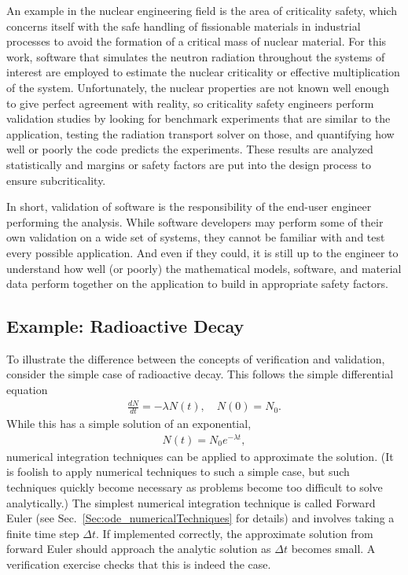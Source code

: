 An example in the nuclear engineering field is the area of criticality safety, which concerns itself with the safe handling of fissionable materials in industrial processes to avoid the formation of a critical mass of nuclear material. For this work, software that simulates the neutron radiation throughout the systems of interest are employed to estimate the nuclear criticality or effective multiplication of the system. Unfortunately, the nuclear properties are not known well enough to give perfect agreement with reality, so criticality safety engineers perform validation studies by looking for benchmark experiments that are similar to the application, testing the radiation transport solver on those, and quantifying how well or poorly the code predicts the experiments. These results are analyzed statistically and margins or safety factors are put into the design process to ensure subcriticality.

In short, validation of software is the responsibility of the end-user engineer performing the analysis. While software developers may perform some of their own validation on a wide set of systems, they cannot be familiar with and test every possible application. And even if they could, it is still up to the engineer to understand how well (or poorly) the mathematical models, software, and material data perform together on the application to build in appropriate safety factors.

\subsection{Example: Radioactive Decay}

To illustrate the difference between the concepts of verification and validation, consider the simple case of radioactive decay. This follows the simple differential equation
\begin{align}
  \frac{dN}{dt} = -\lambda N(t), \quad N(0) = N_0 .
\end{align}
While this has a simple solution of an exponential,
\begin{align}
  N(t) = N_0 e^{-\lambda t} ,
\end{align}
numerical integration techniques can be applied to approximate the solution. (It is foolish to apply numerical techniques to such a simple case, but such techniques quickly become necessary as problems become too difficult to solve analytically.) The simplest numerical integration technique is called Forward Euler (see Sec.~\ref{Sec:ode_numericalTechniques} for details) and involves taking a finite time step $\Delta t$. If implemented correctly, the approximate solution from forward Euler should approach the analytic solution as $\Delta t$ becomes small. A verification exercise checks that this is indeed the case.

